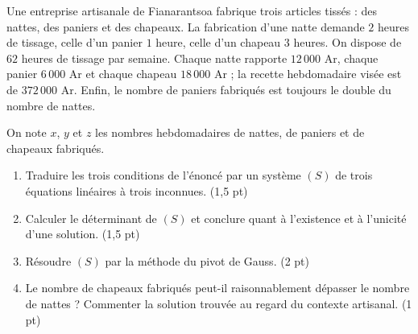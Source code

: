 \begin{commeaubac}
Une entreprise artisanale de Fianarantsoa fabrique trois articles tissés :
des nattes, des paniers et des chapeaux. La fabrication d'une natte demande
$2$ heures de tissage, celle d'un panier $1$ heure, celle d'un chapeau
$3$ heures. On dispose de $62$ heures de tissage par semaine.
Chaque natte rapporte $12\,000$ Ar, chaque panier $6\,000$ Ar et chaque
chapeau $18\,000$ Ar ; la recette hebdomadaire visée est de $372\,000$ Ar.
Enfin, le nombre de paniers fabriqués est toujours le double du nombre de
nattes.

On note $x$, $y$ et $z$ les nombres hebdomadaires de nattes, de paniers et de
chapeaux fabriqués.

\begin{enumerate}[label=\textbf{\arabic*.}, leftmargin=*, itemsep=0.25em]
  \item Traduire les trois conditions de l'énoncé par un système $(S)$ de
        trois équations linéaires à trois inconnues. \hfill\textup{(1,5 pt)}
  \item Calculer le déterminant de $(S)$ et conclure quant à l'existence et à
        l'unicité d'une solution. \hfill\textup{(1,5 pt)}
  \item Résoudre $(S)$ par la méthode du pivot de Gauss.
        \hfill\textup{(2 pt)}
  \item Le nombre de chapeaux fabriqués peut-il raisonnablement dépasser le
        nombre de nattes ? Commenter la solution trouvée au regard du
        contexte artisanal. \hfill\textup{(1 pt)}
\end{enumerate}
\end{commeaubac}

